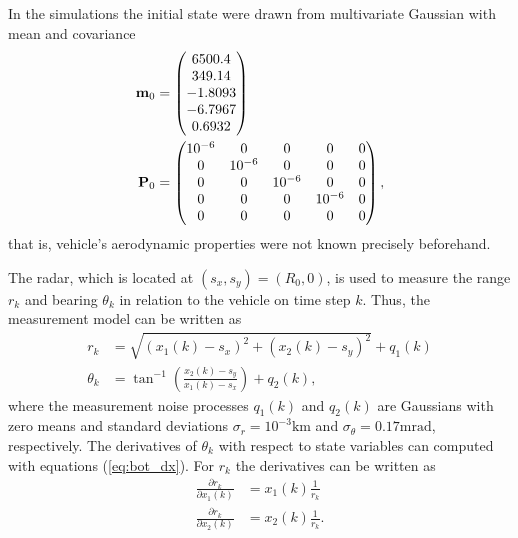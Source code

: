 %
In the simulations the initial state were drawn from multivariate
Gaussian with mean and covariance
%
\begin{equation}
\begin{split}
%
\vec{m}_0 & = \begin{pmatrix} 6500.4 \\ 349.14 \\ -1.8093 \\ -6.7967
\\ 0.6932 \\
\end{pmatrix} \\ \mat{P}_0 & = \begin{pmatrix} 10^{-6} & 0 & 0 & 0 & 0
\\ 0 & 10^{-6}& 0 & 0 & 0 \\ 0 & 0 & 10^{-6} & 0 & 0 \\ 0 & 0 & 0 &
10^{-6}& 0 \\ 0 & 0 & 0 & 0 & 0
\end{pmatrix},
%
\end{split}
\end{equation}
%
that is, vehicle's aerodynamic properties were not known precisely
beforehand.

The radar, which is located at $(s_x, s_y) = (R_0,0)$, is used to
measure the range $r_k$ and bearing $\theta_k$ in relation to the
vehicle on time step $k$. Thus, the measurement model can be written
as
%
\begin{equation}
\begin{split}
%
r_k & = \sqrt{(x_1(k) - s_x)^2 + (x_2(k) - s_y)^2} + q_1(k) \\
\theta_k & = \tan^{-1} \left( \frac{x_2(k) - s_y}{x_1(k) - s_x}\right)
+q_2(k),
%
\end{split}
\end{equation}
%
where the measurement noise processes $q_1(k)$ and $q_2(k)$ are
Gaussians with zero means and standard deviations $\sigma_{r} =
10^{-3} \text{km}$ and $\sigma_{\theta} = 0.17 \text{mrad}$,
respectively. The derivatives of $\theta_k$ with respect to state
variables can computed with equations (\ref{eq:bot_dx}). For $r_k$ the
derivatives can be written as
%
\begin{equation}
\begin{split} \frac{\partial r_k}{\partial x_1(k)} & = x_1(k)
\frac{1}{r_k} \\ \frac{\partial r_k}{\partial x_2(k)} & = x_2(k)
\frac{1}{r_k}.
\end{split}
\end{equation}
%

